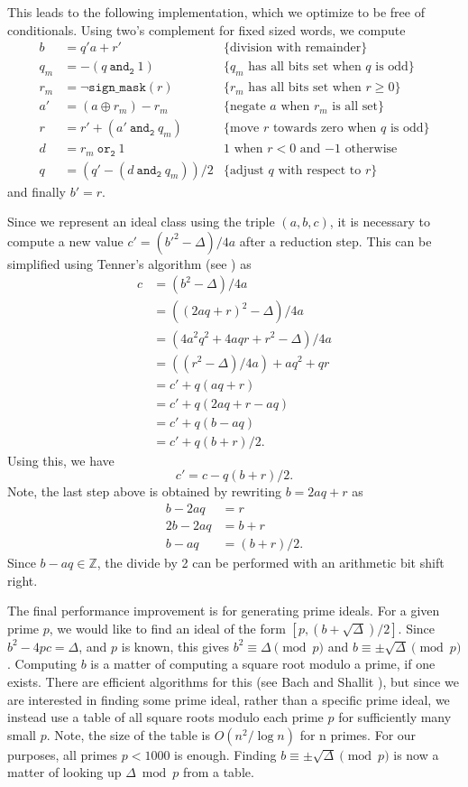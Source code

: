 \documentclass{ucalgthes1}
\theoremstyle{definition}
\newcommand{\ZZ}{\mathbb{Z}}
\newcommand{\band}{~\texttt{and}_\texttt{2}~}
\newcommand{\bor}{~\texttt{or}_\texttt{2}~}
\newcommand{\bxor}{\oplus}
\newcommand{\bnot}{\lnot}
\begin{document}
This leads to the following implementation, which we optimize to be free of conditionals.  Using two's complement for fixed sized words, we compute 
\begin{align*}
b   &= q'a + r' & \textrm{\{division with remainder\}}\\
q_m &= -(q \band 1) & \textrm{\{$q_m$ has all bits set when $q$ is odd\}} \\
r_m &= \bnot\texttt{sign\_mask}(r) & \textrm{\{$r_m$ has all bits set when $r \ge 0$\}} \\
a'  &= (a \bxor r_m) - r_m & \textrm{\{negate $a$ when $r_m$ is all set\}} \\
r   &= r' + (a' \band q_m) & \textrm{\{move $r$ towards zero when $q$ is odd\}} \\
d   &= r_m \bor 1 & \textrm{1 when $r < 0$ and $-1$ otherwise} \\
q   &= (q' - (d \band q_m))/2 & \textrm{\{adjust $q$ with respect to $r$\}}
\end{align*}
and finally $b' = r$.

Since we represent an ideal class using the triple $(a, b, c)$, it is necessary to compute a new value $c' = (b'^2 - \Delta)/4a$ after a reduction step.  This can be simplified using Tenner's algorithm (see \cite[\S 3.4]{Jacobson2009})  as
\begin{align*}
	c &= (b^2 - \Delta)/4a \\
	  &= ((2aq + r)^2 - \Delta)/4a \\
	  &= (4a^2q^2 + 4aqr + r^2 - \Delta)/4a \\
	  &= \left((r^2 - \Delta)/4a\right) + aq^2 + qr \\
	  &= c' + q(aq + r) \\
	  &= c' + q(2aq + r - aq) \\
	  &= c' + q(b - aq) \\
	  &= c' + q(b + r)/2.
\end{align*}
Using this, we have
\[
c' = c - q(b + r)/2.
\]
Note, the last step above is obtained by rewriting $b = 2aq + r$ as
\begin{align*}
	b - 2aq &= r \\
	2b - 2aq &= b + r \\
	b - aq &= (b+r)/2.
\end{align*}
Since $b - aq \in \ZZ$, the divide by 2 can be performed with an arithmetic bit shift right.

The final performance improvement is for generating prime ideals.  For a given prime $p$, we would like to find an ideal of the form $[p, (b + \sqrt\Delta)/2]$.  Since $b^2 - 4pc = \Delta$, and $p$ is known, this gives $b^2 \equiv \Delta \pmod p$ and $b \equiv \pm \sqrt\Delta \pmod p$.  Computing $b$ is a matter of computing a square root modulo a prime, if one exists.  There are efficient algorithms for this (see Bach and Shallit \cite{Bach1996}), but since we are interested in finding some prime ideal, rather than a specific prime ideal, we instead use a table of all square roots modulo each prime $p$ for sufficiently many small $p$.  Note, the size of the table is $O(n^2/\log n)$ for n primes.  For our purposes, all primes $p < 1000$ is enough.  Finding $b \equiv \pm\sqrt\Delta \pmod p$ is now a matter of looking up $\Delta \bmod p$ from a table.  
\end{document}
